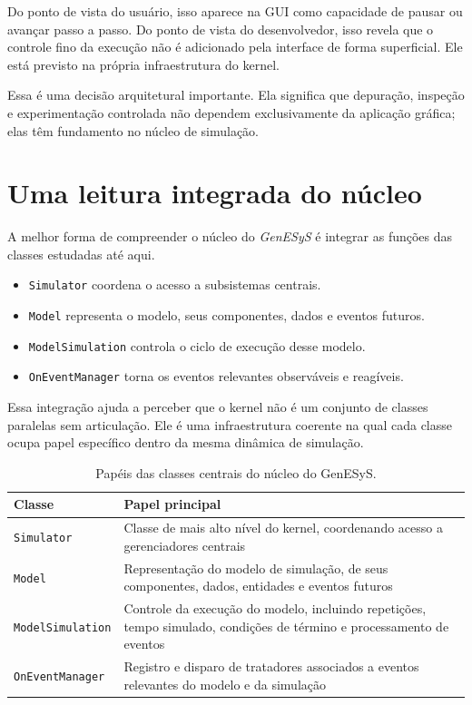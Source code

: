 Do ponto de vista do usuário, isso aparece na GUI como capacidade de pausar ou avançar passo a passo. Do ponto de vista do desenvolvedor, isso revela que o controle fino da execução não é adicionado pela interface de forma superficial. Ele está previsto na própria infraestrutura do kernel.

Essa é uma decisão arquitetural importante. Ela significa que depuração, inspeção e experimentação controlada não dependem exclusivamente da aplicação gráfica; elas têm fundamento no núcleo de simulação.

\section{Uma leitura integrada do núcleo}
\label{sec:cap7_leitura_integrada_nucleo}

A melhor forma de compreender o núcleo do \textit{GenESyS} é integrar as funções das classes estudadas até aqui.

\begin{itemize}
    \item \texttt{Simulator} coordena o acesso a subsistemas centrais.
    \item \texttt{Model} representa o modelo, seus componentes, dados e eventos futuros.
    \item \texttt{ModelSimulation} controla o ciclo de execução desse modelo.
    \item \texttt{OnEventManager} torna os eventos relevantes observáveis e reagíveis.
\end{itemize}

Essa integração ajuda a perceber que o kernel não é um conjunto de classes paralelas sem articulação. Ele é uma infraestrutura coerente na qual cada classe ocupa papel específico dentro da mesma dinâmica de simulação.

\begin{table}[htbp]
    \centering
    \caption{Papéis das classes centrais do núcleo do GenESyS.}
    \label{tab:cap7_papeis_classes_centrais}
    \small
    \begin{tabular}{|p{3.6cm}|p{7.6cm}|}
        \hline
        \textbf{Classe} & \textbf{Papel principal} \\
        \hline
        \texttt{Simulator} & Classe de mais alto nível do kernel, coordenando acesso a gerenciadores centrais \\
        \hline
        \texttt{Model} & Representação do modelo de simulação, de seus componentes, dados, entidades e eventos futuros \\
        \hline
        \texttt{ModelSimulation} & Controle da execução do modelo, incluindo repetições, tempo simulado, condições de término e processamento de eventos \\
        \hline
        \texttt{OnEventManager} & Registro e disparo de tratadores associados a eventos relevantes do modelo e da simulação \\
        \hline
    \end{tabular}
\end{table}

